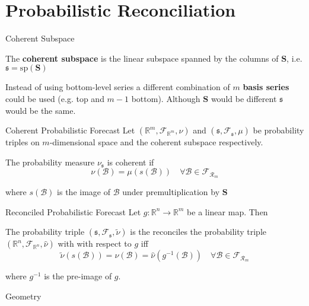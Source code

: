\documentclass{beamer}
\begin{document}
  \section{Probabilistic Reconciliation}
  \begin{frame}{Coherent Subspace}
  	\begin{definition} 
  		The {\bf coherent subspace} is the linear subspace spanned by the columns of ${\bm S}$, i.e. $\mathfrak{s}=\mbox{sp}({\bm S})$
  	\end{definition}
    Instead of using bottom-level series a different combination of $m$ {\bf basis series} could be used (e.g. top and $m-1$ bottom).  Although ${\bm S}$ would be different $\mathfrak{s}$ would be the same.
  \end{frame}
  \begin{frame}{Coherent Probabilistic Forecast}
    Let $(\mathbb{R}^m,\mathcal{F}_{\mathbb{R}^m},\nu)$ and $(\mathfrak{s},\mathcal{F}_{\mathfrak{s}},\mu)$ be probability triples on $m$-dimensional space and the coherent subspace respectively.
    \begin{definition}
      The probability measure $\nu_{\mathfrak{s}}$ is coherent if
      \begin{equation*}
      \nu(\mathcal{B})=\mu(s(\mathcal{B}))\quad\forall\mathcal{B}\in \mathcal{F}_{\mathcal{R}_m}
      \end{equation*} 
    \end{definition}
    where $s(\mathcal{B})$ is the image of $\mathcal{B}$ under premultiplication by ${\bm S}$
  \end{frame}
  \begin{frame}{Reconciled Probabilistic Forecast}
  	Let $g:\mathbb{R}^n\rightarrow\mathbb{R}^m$ be a linear map.  Then 
  	\begin{definition}
  	The probability triple $\left(\mathfrak{s},\mathcal{F}_{\mathfrak{s}},\tilde{\nu}\right)$ is the reconciles the probability triple $\left(\mathbb{R}^n,\mathcal{F}_{\mathbb{R}^n},\hat{\nu}\right)$ with with respect to $g$ iff
  	\begin{equation*}
  	\tilde{\nu}(s(\mathcal{B}))=\nu(\mathcal{B})=\hat{\nu}(g^{-1}(\mathcal{B}))\quad\forall \mathcal{B}\in\mathcal{F}_{\mathcal{R}_m}
  	\end{equation*}
  	\end{definition}
    where $g^{-1}$ is the pre-image of $g$.
  \end{frame}
  \begin{frame}{Geometry}
  	\centering
  	
  \end{frame}
\end{document}
